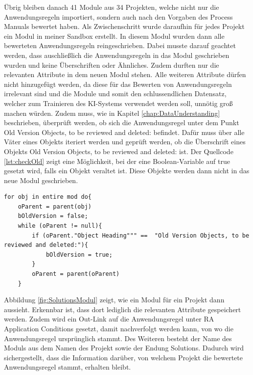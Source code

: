 Übrig bleiben danach 41 Module aus 34 Projekten, welche nicht nur die Anwendungsregeln importiert, sondern auch nach den Vorgaben des Process Manuals bewertet haben. Als Zwischenschritt wurde daraufhin
für jedes Projekt ein Modul in meiner Sandbox erstellt. In diesem Modul wurden dann alle bewerteten Anwendungsregeln reingeschrieben. Dabei musste darauf geachtet werden, dass auschließlich die
Anwendungsregeln in das Modul geschrieben wurden und keine Überschriften oder Ähnliches. Zudem durften nur die relevanten Attribute in dem neuen Modul stehen. Alle weiteren Attribute dürfen nicht
hinzugefügt werden, da diese für das Bewerten von Anwendungsregeln irrelevant sind und die Module und somit den schlussendlichen Datensatz, welcher zum Trainieren des KI-Systems verwendet werden soll,
unnötig groß machen würden. Zudem muss, wie in Kapitel \ref*{chap:DataUnderstanding} beschrieben, überprüft werden, ob sich die Anwendungsregel unter dem Punkt 
\glqq Old Version Objects, to be reviewed and deleted: \grqq{} befindet. Dafür muss über alle Väter eines Objekts iteriert werden und geprüft werden, ob die Überschrift eines Objekts 
\glqq Old Version Objects, to be reviewed and deleted: \grqq{} ist. Der Quellcode \ref*{lst:checkOld} zeigt eine Möglichkeit, bei der eine Boolean-Variable auf true gesetzt wird, falls ein Objekt
veraltet ist. Diese Objekte werden dann nicht in das neue Modul geschrieben.

\begin{lstlisting}[caption={Prüfen, ob Objekt veraltet ist}, captionpos=b, label = lst:checkOld] 
for obj in entire mod do{ 
    oParent = parent(obj)
    bOldVersion = false;
    while (oParent != null){
        if (oParent."Object Heading""" ==  "Old Version Objects, to be reviewed and deleted:"){
            bOldVersion = true;
        }
        oParent = parent(oParent)
    }
\end{lstlisting}

Abbildung \ref*{fig:SolutionsModul} zeigt, wie ein Modul für ein Projekt dann aussieht. Erkennbar ist, dass dort lediglich die relevanten Attribute gespeichert werden. Zudem wird ein Out-Link auf die
Anwendungsregel unter RA Application Conditions gesetzt, damit nachverfolgt werden kann, von wo die Anwendungsregel ursprünglich stammt. Des Weiteren besteht der Name des Moduls aus dem Namen
des Projekt sowie der Endung  Solutions. Dadurch wird sichergestellt, dass die Information darüber, von welchem Projekt die bewertete Anwendungsregel stammt, erhalten bleibt.

